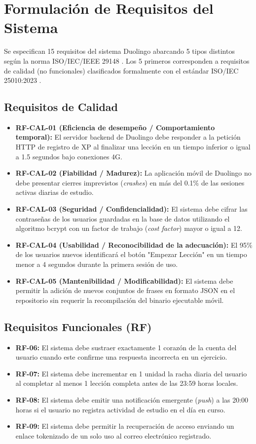 \documentclass[11pt, a4paper]{article}
\begin{document}
\section{Formulación de Requisitos del Sistema}
Se especifican 15 requisitos del sistema Duolingo abarcando 5 tipos distintos según la norma ISO/IEC/IEEE 29148 \cite{iso29148}. Los 5 primeros corresponden a requisitos de calidad (no funcionales) clasificados formalmente con el estándar ISO/IEC 25010:2023 \cite{iso25010}.

\subsection{Requisitos de Calidad}
\begin{itemize}
    \item \textbf{RF-CAL-01 (Eficiencia de desempeño / Comportamiento temporal):} El servidor backend de Duolingo debe responder a la petición HTTP de registro de XP al finalizar una lección en un tiempo inferior o igual a 1.5 segundos bajo conexiones 4G.
    \item \textbf{RF-CAL-02 (Fiabilidad / Madurez):} La aplicación móvil de Duolingo no debe presentar cierres imprevistos (\textit{crashes}) en más del 0.1\% de las sesiones activas diarias de estudio.
    \item \textbf{RF-CAL-03 (Seguridad / Confidencialidad):} El sistema debe cifrar las contraseñas de los usuarios guardadas en la base de datos utilizando el algoritmo bcrypt con un factor de trabajo (\textit{cost factor}) mayor o igual a 12.
    \item \textbf{RF-CAL-04 (Usabilidad / Reconocibilidad de la adecuación):} El 95\% de los usuarios nuevos identificará el botón "Empezar Lección" en un tiempo menor a 4 segundos durante la primera sesión de uso.
    \item \textbf{RF-CAL-05 (Mantenibilidad / Modificabilidad):} El sistema debe permitir la adición de nuevos conjuntos de frases en formato JSON en el repositorio sin requerir la recompilación del binario ejecutable móvil.
\end{itemize}

\subsection{Requisitos Funcionales (RF)}
\begin{itemize}
    \item \textbf{RF-06:} El sistema debe sustraer exactamente 1 corazón de la cuenta del usuario cuando este confirme una respuesta incorrecta en un ejercicio.
    \item \textbf{RF-07:} El sistema debe incrementar en 1 unidad la racha diaria del usuario al completar al menos 1 lección completa antes de las 23:59 horas locales.
    \item \textbf{RF-08:} El sistema debe emitir una notificación emergente (\textit{push}) a las 20:00 horas si el usuario no registra actividad de estudio en el día en curso.
    \item \textbf{RF-09:} El sistema debe permitir la recuperación de acceso enviando un enlace tokenizado de un solo uso al correo electrónico registrado.
\end{itemize}
\end{document}

